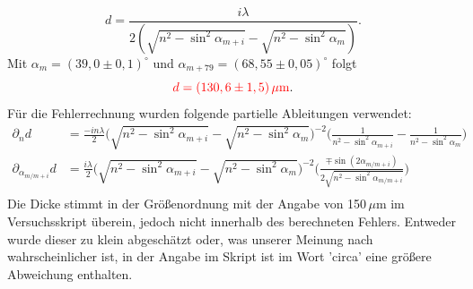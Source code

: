 \begin{equation*}
    d = \frac{i\lambda}{2(\sqrt{n^2-\sin^2\alpha_{m+i}} - \sqrt{n^2-\sin^2\alpha_m})}.
\end{equation*}
Mit $\alpha_m = (39,0 \pm 0,1)^\circ$ und $\alpha_{m+79} = (68,55 \pm 0,05)^\circ$ folgt 
\begin{equation*}
    \textcolor{red}{d = (130,6 \pm 1,5)\,\mu\mathrm{m}}.
\end{equation*}
Für die Fehlerrechnung wurden folgende partielle Ableitungen verwendet:
\begin{align*}
    \partial_nd &= \frac{-in\lambda}{2}\big(\sqrt{n^2-\sin^2\alpha_{m+i}}- \sqrt{n^2-\sin^2\alpha_{m}}\big)^{-2}\big(\frac{1}{n^2-\sin^2\alpha_{m+i}} - \frac{1}{n^2-\sin^2\alpha_{m}}\big)\\
    \partial_{\alpha_{m/m+i}}d &= \frac{i\lambda}{2}\big(\sqrt{n^2-\sin^2\alpha_{m+i}}- \sqrt{n^2-\sin^2\alpha_{m}}\big)^{-2}\bigg(\frac{\mp \sin(2\alpha_{m/m+i})}{2\sqrt{n^2-\sin^2\alpha_{m/m+i}}}\bigg)\\
\end{align*}
Die Dicke stimmt in der Größenordnung mit der Angabe von 150\,$\mu$m im Versuchsskript überein, jedoch nicht innerhalb des berechneten Fehlers. Entweder wurde dieser zu klein 
abgeschätzt oder, was unserer Meinung nach wahrscheinlicher ist, in der Angabe im Skript ist im Wort 'circa' eine größere Abweichung enthalten.